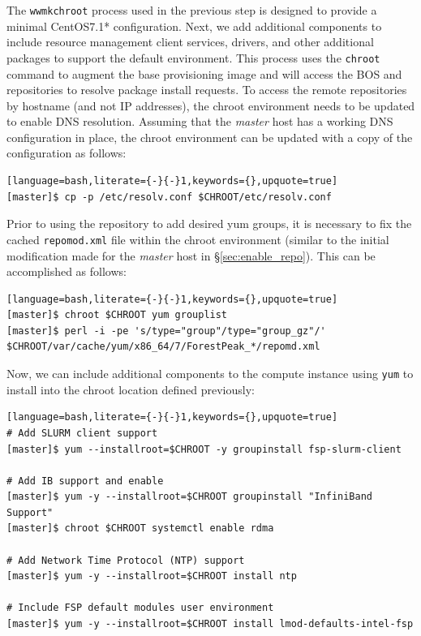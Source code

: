 \documentclass[letterpaper]{article}
\newcommand{\baseOS}{CentOS7.1*}
\begin{document}
The \texttt{wwmkchroot} process used in the previous step is designed to
provide a minimal \baseOS{} configuration. Next, we add additional components to
include resource management client services, \InfiniBand{} drivers, and other
additional packages to support the default \FSP{} environment.  This process uses
the \texttt{chroot} command to augment the base provisioning image and will
access the BOS and \FSP{} repositories to resolve package install requests. To
access the remote repositories by hostname (and not IP addresses), the chroot
environment needs to be updated to enable DNS resolution. Assuming that
the {\em master} host has a working DNS configuration in place, the chroot environment can
be updated with a copy of the configuration as follows:

\begin{lstlisting}[language=bash,literate={-}{-}1,keywords={},upquote=true]
[master]$ cp -p /etc/resolv.conf $CHROOT/etc/resolv.conf
\end{lstlisting}

\noindent Prior to using the \FSP{} repository to add desired yum groups, it is
necessary to fix the cached \texttt{repomod.xml} file within the chroot
environment (similar to the initial modification made for the {\em master} host
in \S\ref{sec:enable_repo}). This can be accomplished as follows:

\begin{lstlisting}[language=bash,literate={-}{-}1,keywords={},upquote=true]
[master]$ chroot $CHROOT yum grouplist
[master]$ perl -i -pe 's/type="group"/type="group_gz"/' $CHROOT/var/cache/yum/x86_64/7/ForestPeak_*/repomd.xml
\end{lstlisting}

\noindent Now, we can include additional components to the compute instance using
\texttt{yum} to install into the chroot location defined previously:

\begin{lstlisting}[language=bash,literate={-}{-}1,keywords={},upquote=true]
# Add SLURM client support
[master]$ yum --installroot=$CHROOT -y groupinstall fsp-slurm-client

# Add IB support and enable
[master]$ yum -y --installroot=$CHROOT groupinstall "InfiniBand Support"
[master]$ chroot $CHROOT systemctl enable rdma

# Add Network Time Protocol (NTP) support
[master]$ yum -y --installroot=$CHROOT install ntp

# Include FSP default modules user environment
[master]$ yum -y --installroot=$CHROOT install lmod-defaults-intel-fsp
\end{lstlisting}
\end{document}

